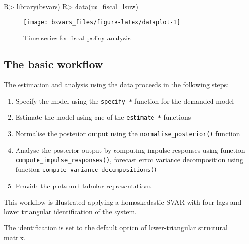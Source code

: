 \documentclass[
  nojss]{jss}
\providecommand{\tightlist}{%
  \setlength{\itemsep}{0pt}\setlength{\parskip}{0pt}}
\begin{document}
\begin{CodeChunk}
\begin{CodeInput}
R> library(bsvars)
R> data(us_fiscal_lsuw)
\end{CodeInput}
\end{CodeChunk}

\begin{CodeChunk}
\begin{figure}

{\centering \texttt{[image: bsvars\_files/figure-latex/dataplot-1]} 

}

\caption[Time series for fiscal policy analysis]{Time series for fiscal policy analysis}\label{fig:dataplot}
\end{figure}
\end{CodeChunk}

\subsection{The basic workflow}

The estimation and analysis using the data proceeds in the following
steps:

\begin{enumerate}
\def\labelenumi{\arabic{enumi}.}
\tightlist
\item
  Specify the model using the \texttt{specify\_*} function for the
  demanded model
\item
  Estimate the model using one of the \texttt{estimate\_*} functions
\item
  Normalise the posterior output using the
  \texttt{normalise\_posterior()} function
\item
  Analyse the posterior output by computing impulse responses using
  function \linebreak \texttt{compute\_impulse\_responses()}, forecast
  error variance decomposition using function
  \texttt{compute\_variance\_decompositions()}
\item
  Provide the plots and tabular representations.
\end{enumerate}

This workflow is illustrated applying a homoskedastic SVAR with four
lags and lower triangular identification of the system.

\begin{CodeChunk}
\begin{CodeOutput}
The identification is set to the default option of lower-triangular structural matrix.
\end{CodeOutput}
\end{CodeChunk}
\end{document}
